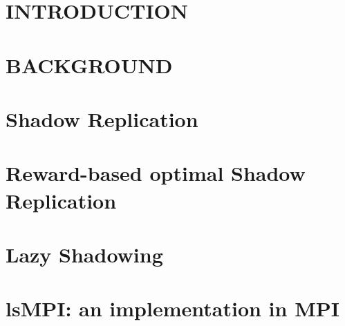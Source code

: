 \documentclass[pdftex]{pittetd}   %
\begin{document}
\chapter{INTRODUCTION}
\label{chapter:intro}


\chapter{BACKGROUND}
\label{chapter:background}


\chapter{Shadow Replication}
\label{chapter:shadowing}


\chapter{Reward-based optimal Shadow Replication}
\label{chapter:reward}


\chapter{Lazy Shadowing}
\label{chapter:scale}


\chapter{\texorpdfstring{\MakeLowercase{ls}MPI}{lsMPI}: an implementation in MPI}
\label{chapter:implementation}

\end{document}

